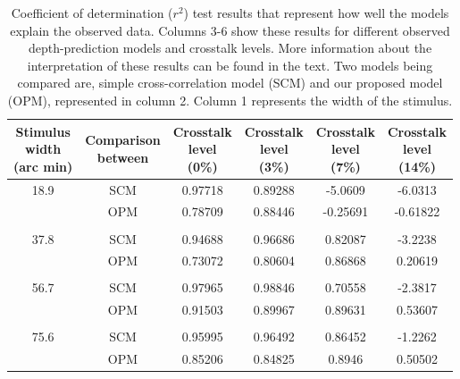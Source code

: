 \begin{table}[H]
  \begin{center}
    \caption{Coefficient of determination ($r^2$) test results that represent how well the models explain the observed data. Columns 3-6 show these results for different observed depth-prediction models and crosstalk levels. More information about the interpretation of these results can be found in the text. Two models being compared are, simple cross-correlation model (SCM) and our proposed model (OPM), represented in column 2. Column 1 represents the width of the stimulus.}
    \label{tab:model_fitting_test}
    \begin{tabular}{cccccc}
      \toprule
       \specialcell{Stimulus\\width\\(arc min)} &  \specialcell{Comparison\\between\\ }  &  \specialcell{Crosstalk\\level\\(0\%)} & \specialcell{Crosstalk\\level\\(3\%)} & \specialcell{Crosstalk\\level\\(7\%)} & \specialcell{Crosstalk\\level\\(14\%)}\\
      \midrule
      18.9      & SCM & 0.97718     &       0.89288    &    -5.0609   &      -6.0313 \\
                & OPM & 0.78709     &       0.88446    &    -0.25691  &      -0.61822  \\
                & & & & \\
      37.8      & SCM & 0.94688     &       0.96686    &    0.82087   &    -3.2238\\
                & OPM & 0.73072     &       0.80604    &   0.86868    &     0.20619\\
                & & & & \\
      56.7      & SCM & 0.97965     &       0.98846    &    0.70558   &      -2.3817\\
                & OPM & 0.91503     &       0.89967    &    0.89631   &      0.53607\\
                & & & & \\
      75.6      & SCM & 0.95995     &       0.96492    &    0.86452   &      -1.2262\\
                & OPM & 0.85206     &       0.84825    &    0.8946    &      0.50502\\
      \bottomrule
    \end{tabular}
  \end{center}
\end{table}

